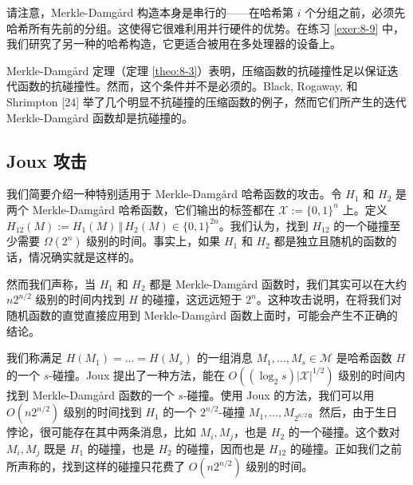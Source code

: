 \begin{snote}[变体。]
请注意，Merkle-Damg{\aa}rd 构造本身是串行的——在哈希第 $i$ 个分组之前，必须先哈希所有先前的分组。这使得它很难利用并行硬件的优势。在练习 \ref{exer:8-9} 中，我们研究了另一种的哈希构造，它更适合被用在多处理器的设备上。

Merkle-Damg{\aa}rd 定理（定理 \ref{theo:8-3}）表明，压缩函数的抗碰撞性足以保证迭代函数的抗碰撞性。然而，这个条件并不是必须的。Black, Rogaway, 和 Shrimpton [24] 举了几个明显不抗碰撞的压缩函数的例子，然而它们所产生的迭代 Merkle-Damg{\aa}rd 函数却是抗碰撞的。
\end{snote}

\subsection{Joux 攻击}\label{subsec:8-4-1}

我们简要介绍一种特别适用于 Merkle-Damg{\aa}rd 哈希函数的攻击。令 $H_1$ 和 $H_2$ 是两个 Merkle-Damg{\aa}rd 哈希函数，它们输出的标签都在 $\mathcal{X}:=\{0,1\}^n$ 上。定义 $H_{12}(M):=H_1(M)\,\Vert\,H_2(M)\in\{0,1\}^{2n}$。我们认为，找到 $H_{12}$ 的一个碰撞至少需要 $\Omega(2^n)$ 级别的时间。事实上，如果 $H_1$ 和 $H_2$ 都是独立且随机的函数的话，情况确实就是这样的。

然而我们声称，当 $H_1$ 和 $H_2$ 都是 Merkle-Damg{\aa}rd 函数时，我们其实可以在大约 $n2^{n/2}$ 级别的时间内找到 $H$ 的碰撞，这远远短于 $2^n$。这种攻击说明，在将我们对随机函数的直觉直接应用到 Merkle-Damg{\aa}rd 函数上面时，可能会产生不正确的结论。

我们称满足 $H(M_1)= \dots =H(M_s)$ 的一组消息 $M_1,\dots,M_s\in\mathcal{M}$ 是哈希函数 $H$ 的一个 $s$-碰撞。Joux 提出了一种方法，能在 $O((\log_2s)|\mathcal{X}|^{1/2})$ 级别的时间内找到 Merkle-Damg{\aa}rd 函数的一个 $s$-碰撞。使用 Joux 的方法，我们可以用 $O(n2^{n/2})$ 级别的时间找到 $H_1$ 的一个 $2^{n/2}$-碰撞 $M_1,\dots,M_{2^{n/2}}$。然后，由于生日悖论，很可能存在其中两条消息，比如 $M_i,M_j$，也是 $H_2$ 的一个碰撞。这个数对 $M_i,M_j$ 既是 $H_1$ 的碰撞，也是 $H_2$ 的碰撞，因而也是 $H_{12}$ 的碰撞。正如我们之前所声称的，找到这样的碰撞只花费了 $O(n2^{n/2})$ 级别的时间。

